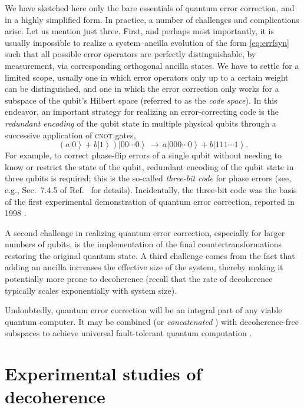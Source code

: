 \documentclass[3p,sort&compress,12pt]{elsarticle}
\newcommand{\ket}[1]{\left\vert{#1}\right\rangle}
\begin{document}
We have sketched here only the bare essentials of quantum error correction, and in a highly simplified form. In practice, a number of challenges and complications arise. Let us mention just three. First, and perhaps most importantly, it is usually impossible to realize a system--ancilla evolution of the form \eqref{eq:errfsyn} such that all possible error operators are perfectly distinguishable, by measurement, via corresponding orthogonal ancilla states. We have  to settle for a limited scope, usually one in which error operators only up to a certain weight can be distinguished, and one in which the error correction only works for a subspace of the qubit's Hilbert space (referred to as the \emph{code space}). In this endeavor, an important strategy for realizing an error-correcting code is the \emph{redundant encoding} of the qubit state in multiple physical qubits through a successive application of \textsc{cnot} gates, 
%
\begin{equation}\label{eq:snba}
  \left(a\ket{0} + b\ket{1}\right)\ket{0 0 \cdots
    0 }  \,\longrightarrow\, a \ket{0 0 0 \cdots
    0 } + b \ket{1 1 1 \cdots 1 }.
\end{equation}
%
For example, to correct phase-flip errors of a single qubit without needing to know or restrict the state of the qubit, redundant encoding of the qubit state in three qubits is required; this is the so-called \emph{three-bit code} for phase errors (see, e.g., Sec.~7.4.5 of Ref.~\cite{Schlosshauer:2007:un} for details). Incidentally, the three-bit code was the basis of the first experimental demonstration of quantum error correction, reported in 1998 \cite{Cory:1998:uu}.

A second challenge in realizing quantum error correction, especially for larger numbers of qubits, is the implementation of the final countertransformations restoring the original quantum state. A third challenge comes from the fact that adding an ancilla increases the effective size of the system, thereby making it potentially more prone to decoherence (recall that the rate of decoherence typically scales exponentially with system size). 

Undoubtedly, quantum error correction will be an integral part of any viable quantum computer. It may be combined (or \emph{concatenated} \cite{Lidar:1999:fa}) with decoherence-free subspaces to achieve universal fault-tolerant quantum computation \cite{Bacon:2000:yy,Lidar:2001:oo}.

\section{\label{sec:exper-observ-decoh}Experimental studies of decoherence}
\end{document}
